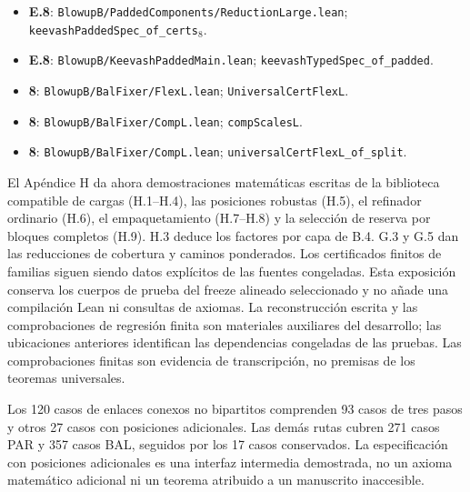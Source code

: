 \documentclass[spanish,11pt,a4paper]{article}
\begin{document}
\begin{itemize}
\item
  \textbf{E.8}: \texttt{Blowup\allowbreak{}B/\allowbreak{}Padd\allowbreak{}ed\allowbreak{}Components\allowbreak{}/\allowbreak{}Reduction\allowbreak{}La\allowbreak{}rge.\allowbreak{}lean}; \texttt{keevash\allowbreak{}Padde\allowbreak{}d\allowbreak{}Spec\_\allowbreak{}of\_\allowbreak{}cer\allowbreak{}ts\ensuremath{{}_{8}}}.
\item
  \textbf{E.8}: \texttt{Blowup\allowbreak{}B/\allowbreak{}Keev\allowbreak{}ash\allowbreak{}Padded\allowbreak{}Mai\allowbreak{}n.\allowbreak{}lean}; \texttt{keevash\allowbreak{}Typed\allowbreak{}\allowbreak{}Spec\_\allowbreak{}of\_\allowbreak{}padd\allowbreak{}ed}.
\item
  \textbf{8}: \texttt{Blowup\allowbreak{}B/\allowbreak{}Bal\allowbreak{}F\allowbreak{}ixer/\allowbreak{}Flex\allowbreak{}L.\allowbreak{}l\allowbreak{}ean}; \texttt{Universal\allowbreak{}Cer\allowbreak{}t\allowbreak{}Flex\allowbreak{}L}.
\item
  \textbf{8}: \texttt{Blowup\allowbreak{}B/\allowbreak{}Bal\allowbreak{}F\allowbreak{}ixer/\allowbreak{}Comp\allowbreak{}L.\allowbreak{}l\allowbreak{}ean}; \texttt{comp\allowbreak{}Scales\allowbreak{}L}.
\item
  \textbf{8}: \texttt{Blowup\allowbreak{}B/\allowbreak{}Bal\allowbreak{}F\allowbreak{}ixer/\allowbreak{}Comp\allowbreak{}L.\allowbreak{}l\allowbreak{}ean}; \texttt{universal\allowbreak{}Cer\allowbreak{}t\allowbreak{}Flex\allowbreak{}L\_\allowbreak{}of\_\allowbreak{}sp\allowbreak{}lit}.
\end{itemize}

El Apéndice H da ahora demostraciones matemáticas escritas de la biblioteca compatible de cargas (H.1--H.4), las posiciones robustas (H.5), el refinador ordinario (H.6), el empaquetamiento (H.7--H.8) y la selección de reserva por bloques completos (H.9). H.3 deduce los factores por capa de B.4. G.3 y G.5 dan las reducciones de cobertura y caminos ponderados. Los certificados finitos de familias siguen siendo datos explícitos de las fuentes congeladas. Esta exposición conserva los cuerpos de prueba del freeze alineado seleccionado y no añade una compilación Lean ni consultas de axiomas. La reconstrucción escrita y las comprobaciones de regresión finita son materiales auxiliares del desarrollo; las ubicaciones anteriores identifican las dependencias congeladas de las pruebas. Las comprobaciones finitas son evidencia de transcripción, no premisas de los teoremas universales.

Los 120 casos de enlaces conexos no bipartitos comprenden 93 casos de tres pasos y otros 27 casos con posiciones adicionales. Las demás rutas cubren 271 casos PAR y 357 casos BAL, seguidos por los 17 casos conservados. La especificación con posiciones adicionales es una interfaz intermedia demostrada, no un axioma matemático adicional ni un teorema atribuido a un manuscrito inaccesible.
\end{document}
